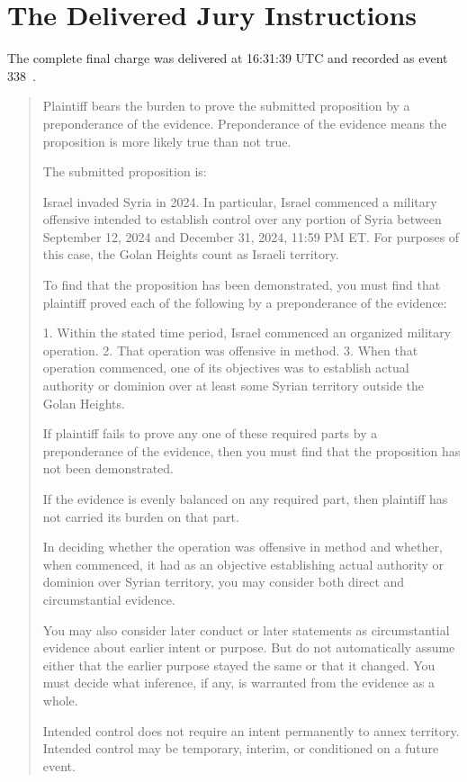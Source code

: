 \section{The Delivered Jury Instructions}
The complete final charge was delivered at 16:31:39 UTC and recorded as event 338~\cite{record}.
\begin{quote}
Plaintiff bears the burden to prove the submitted proposition by a preponderance of the evidence. Preponderance of the evidence means the proposition is more likely true than not true.

The submitted proposition is:

Israel invaded Syria in 2024. In particular, Israel commenced a military offensive intended to establish control over any portion of Syria between September 12, 2024 and December 31, 2024, 11:59 PM ET. For purposes of this case, the Golan Heights count as Israeli territory.

To find that the proposition has been demonstrated, you must find that plaintiff proved each of the following by a preponderance of the evidence:

1. Within the stated time period, Israel commenced an organized military operation.
2. That operation was offensive in method.
3. When that operation commenced, one of its objectives was to establish actual authority or dominion over at least some Syrian territory outside the Golan Heights.

If plaintiff fails to prove any one of these required parts by a preponderance of the evidence, then you must find that the proposition has not been demonstrated.

If the evidence is evenly balanced on any required part, then plaintiff has not carried its burden on that part.

In deciding whether the operation was offensive in method and whether, when commenced, it had as an objective establishing actual authority or dominion over Syrian territory, you may consider both direct and circumstantial evidence.

You may also consider later conduct or later statements as circumstantial evidence about earlier intent or purpose. But do not automatically assume either that the earlier purpose stayed the same or that it changed. You must decide what inference, if any, is warranted from the evidence as a whole.

Intended control does not require an intent permanently to annex territory. Intended control may be temporary, interim, or conditioned on a future event.


\end{quote}
